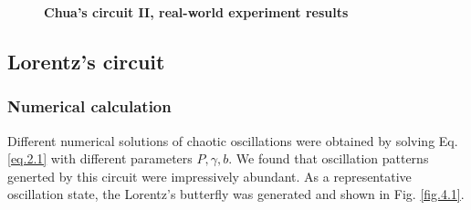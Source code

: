 \documentclass[10pt,a4paper,twocolumn,twoside,UTF8]{article}
\begin{document}
			\begin{figure}[htbp]
				\centering
				
				\caption{\textbf{Chua's circuit II, real-world experiment results}}
				\label{fig.3.2}
			\end{figure}

	\subsection{Lorentz's circuit}
		\subsubsection{Numerical calculation}
		Different numerical solutions of chaotic oscillations were obtained by solving Eq. \ref{eq.2.1} with different parameters $P, \gamma, b$.
		We found that oscillation patterns generted by this circuit were impressively abundant. 
		As a representative oscillation state, the Lorentz's butterfly was generated and shown in Fig. \ref{fig.4.1}.
\end{document}
